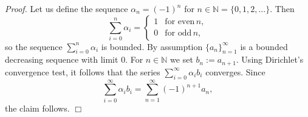 \documentclass[12pt]{article}
\begin{document}
\newcommand{\sN}[0]{\mathbb{N}}
\emph{Proof.} 
Let us define the sequence $\alpha_n =(-1)^n$ for
$n\in \sN=\{0,1,2,\ldots\}.$ Then
 \[\sum_{i=0}^n \alpha_i =\left\{
 \begin{array}{ll}
 1 &\mbox{for even} \,n, \\
 0 & \mbox{for odd}\, n,
 \end{array}\right.\]
so the sequence $\sum_{i=0}^n \alpha_i$ is bounded.
By assumption $\{a_n\}_{n=1}^\infty$ is a bounded decreasing 
sequence with limit $0$.
For $n\in \sN$ we set $b_{n}:=a_{n+1}$. 
Using Dirichlet's convergence test, it follows that the series
$\sum_{i=0}^{\infty} \alpha_i b_i$ converges. Since 
$$\sum_{i=0}^{\infty} \alpha_i b_i =\sum_{n=1}^{\infty} (-1)^{n+1} a_n,$$
the claim follows.
$\Box$
\end{document}
